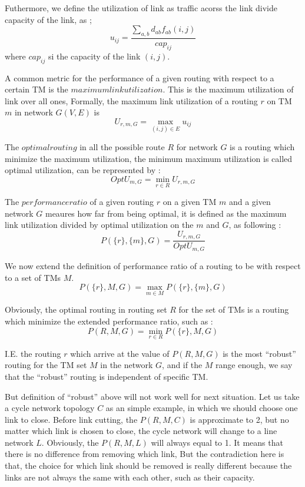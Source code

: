 \documentclass[conference]{IEEEtran}
\begin{document}
Futhermore, we define the utilization of link as traffic acorss the link divide capacity of the link, as ;
\begin{equation}
	u_{ij} = \frac{\sum_{a,b} d_{ab}f_{ab}(i,j)}{cap_{ij}}
\end{equation}
where $cap_{ij}$ si the capacity of the link $(i,j)$.

A common metric for the performance of a given routing with respect to a certain TM is the $maximum link utilization$.
This is the maximum utilization of link over all ones, Formally, the maximum link utilization of a routing $r$ on 
TM $m$ in network $G(V,E)$ is 
\begin{equation}
	U_{r, m, G} = \max_{(i,j)\in E} u_{ij}
\end{equation}

The $optimal routing$ in all the possible route $R$ for network $G$ is a routing which minimize the maximum utilization,
the minimum maximum utilization is called optimal utilization, can be represented by :
\begin{equation}
	OptU_{m, G} = \min_{r\in R} U_{r, m, G}
\end{equation}

The $performance ratio$ of a given routing $r$ on a given TM $m$ and a given network $G$ meaures how far from being 
optimal, it is defined as the maximum link utilization divided by optimal utilization on the $m$ and $G$, as following : 
\begin{equation}
	P(\{ r \},\{ m \}, G) = \frac{U_{r,m,G}}{OptU_{m,G}}
\end{equation}

We now extend the definition of performance ratio of a routing to be with respect to a set of TMs $M$. 
\begin{equation}
	P(\{ r \}, M, G) = \max_{m\in M} P(\{ r \}, \{ m \}, G)
\end{equation}

Obviously, the optimal routing in routing set $R$ for the set of TMs is a routing which minimize the extended 
performance ratio, such as :
\begin{equation}
	P(R, M, G) = \min_{r\in R} P(\{ r \}, M, G)
\end{equation}

I.E. the routing $r$ which arrive at the value of $P(R,M,G)$ is the most ``robust'' routing for the TM set $M$ 
in the network $G$, and if the $M$ range enough, we say that the ``robust'' routing is independent of specific TM.

But definition of ``robust'' above will not work well for next situation. Let us take a cycle network topology $C$ as 
an simple example, in which we should choose one link to close. Before link cutting, the $P(R, M, C)$ is 
approximate to 2, but no matter which link is chosen to close, the cycle network will change to a line network $L$. 
Obviously, the $P(R, M, L)$ will always equal to 1. It means that there is no difference from removing which link,
But the contradiction here is that, the choice for which link should be removed is really different because the 
links are not always the same with each other, such as their capacity.
\end{document}
